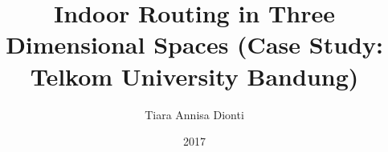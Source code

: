 \documentclass[a4paper,12pt,oneside]{book}
\title{Indoor Routing in Three Dimensional Spaces 
	(Case Study: Telkom University Bandung)
}\let\Title\@title   %
\author{Tiara Annisa Dionti}  \let\Author\@author  %
\date{2017}           \let\Date\@date %
\renewcommand\thesection{\arabic{chapter}.\arabic{section}}
\renewcommand\thesubsection{\thesection.\arabic{subsection}}
\newif\iflogTA
\begin{document}
\begin{titlepage}
\thispagestyle{empty}

\pagebreak
\thispagestyle{empty}

\pagebreak
\end{titlepage}
%
\iflogTA
\pagebreak
\addcontentsline{toc}{chapter}{Abstract}

\pagebreak
\addcontentsline{toc}{chapter}{Declaration Sheet}

\pagebreak
\addcontentsline{toc}{chapter}{Acknowledgement}

\pagebreak
\addcontentsline{toc}{chapter}{Preface}

\pagebreak
\fi
\cleardoublepage
{}
\tableofcontents
\iflogTA
\newpage
\cleardoublepage
\addcontentsline{toc}{chapter}{List of Figures}
\listoffigures
\newpage
\cleardoublepage
\addcontentsline{toc}{chapter}{List of Table}
\listoftables
\fi
%
\cleardoublepage
{}

%

%

%

%

%
{}


%
\renewcommand\thesection{\Alph{section}}
\renewcommand\thesubsection{\thesection.\Alph{subsection}}

\end{document}

